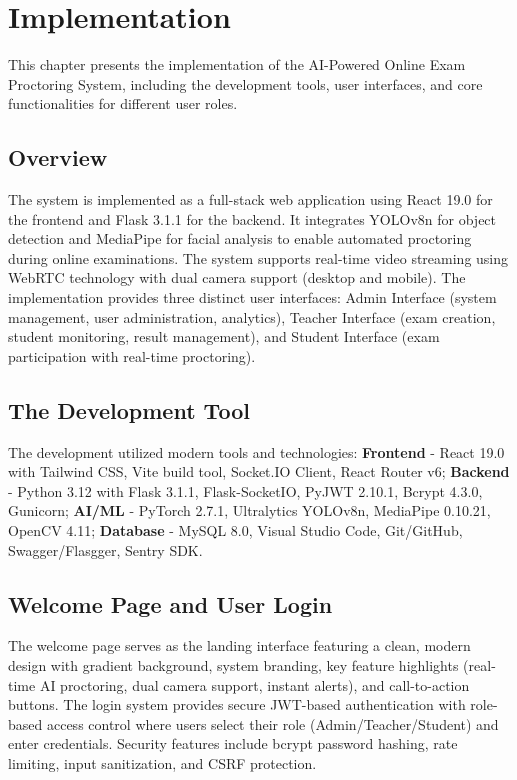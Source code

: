 \chapter{Implementation}

This chapter presents the implementation of the AI-Powered Online Exam Proctoring System, including the development tools, user interfaces, and core functionalities for different user roles.

\section{Overview}

The system is implemented as a full-stack web application using React 19.0 for the frontend and Flask 3.1.1 for the backend. It integrates YOLOv8n for object detection and MediaPipe for facial analysis to enable automated proctoring during online examinations. The system supports real-time video streaming using WebRTC technology with dual camera support (desktop and mobile). The implementation provides three distinct user interfaces: Admin Interface (system management, user administration, analytics), Teacher Interface (exam creation, student monitoring, result management), and Student Interface (exam participation with real-time proctoring).

\section{The Development Tool}

The development utilized modern tools and technologies: \textbf{Frontend} - React 19.0 with Tailwind CSS, Vite build tool, Socket.IO Client, React Router v6; \textbf{Backend} - Python 3.12 with Flask 3.1.1, Flask-SocketIO, PyJWT 2.10.1, Bcrypt 4.3.0, Gunicorn; \textbf{AI/ML} - PyTorch 2.7.1, Ultralytics YOLOv8n, MediaPipe 0.10.21, OpenCV 4.11; \textbf{Database} - MySQL 8.0, Visual Studio Code, Git/GitHub, Swagger/Flasgger, Sentry SDK.

\section{Welcome Page and User Login}

The welcome page serves as the landing interface featuring a clean, modern design with gradient background, system branding, key feature highlights (real-time AI proctoring, dual camera support, instant alerts), and call-to-action buttons. The login system provides secure JWT-based authentication with role-based access control where users select their role (Admin/Teacher/Student) and enter credentials. Security features include bcrypt password hashing, rate limiting, input sanitization, and CSRF protection.

